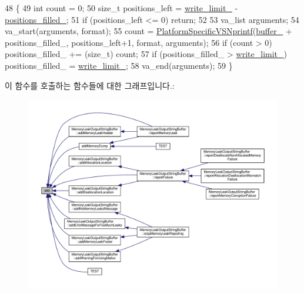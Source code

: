 \begin{DoxyCode}
48 \{
49     \textcolor{keywordtype}{int} count = 0;
50     \textcolor{keywordtype}{size\_t} positions\_left = \hyperlink{struct_simple_string_buffer_a90266a524d354421a6fd68337917d395}{write\_limit\_} - \hyperlink{struct_simple_string_buffer_ad38da5740fb5613e7c7745641be11761}{positions\_filled\_};
51     \textcolor{keywordflow}{if} (positions\_left <= 0) \textcolor{keywordflow}{return};
52 
53     va\_list arguments;
54     va\_start(arguments, format);
55     count = \hyperlink{_platform_specific_functions__c_8h_a7b79317c2f38650de96527ab82515e9a}{PlatformSpecificVSNprintf}(\hyperlink{struct_simple_string_buffer_af38d458694e4e0863b2a2b77fd980706}{buffer\_} + positions\_filled\_, 
      positions\_left+1, format, arguments);
56     \textcolor{keywordflow}{if} (count > 0) positions\_filled\_ += (size\_t) count;
57     \textcolor{keywordflow}{if} (positions\_filled\_ > \hyperlink{struct_simple_string_buffer_a90266a524d354421a6fd68337917d395}{write\_limit\_}) positions\_filled\_ = 
      \hyperlink{struct_simple_string_buffer_a90266a524d354421a6fd68337917d395}{write\_limit\_};
58     va\_end(arguments);
59 \}
\end{DoxyCode}


이 함수를 호출하는 함수들에 대한 그래프입니다.\+:
\nopagebreak
\begin{figure}[H]
\begin{center}
\leavevmode
\includegraphics[width=350pt]{struct_simple_string_buffer_ae2aa8147b398c989b73608c779bc7611_icgraph}
\end{center}
\end{figure}



